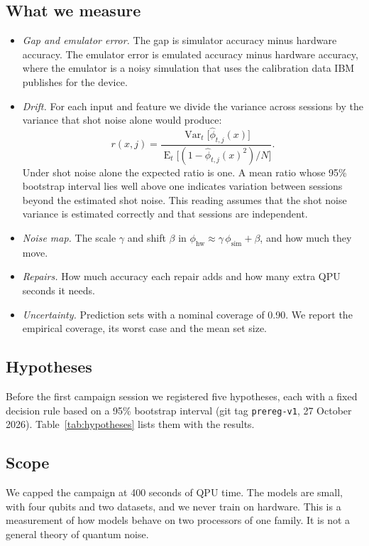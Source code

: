 \documentclass[10pt,conference]{IEEEtran}
\begin{document}
\subsection{What we measure}
\begin{itemize}
\item \emph{Gap and emulator error.} The gap is simulator accuracy minus hardware accuracy. The
emulator error is emulated accuracy minus hardware accuracy, where the emulator is a noisy
simulation that uses the calibration data IBM publishes for the device.
\item \emph{Drift.} For each input and feature we divide the variance across sessions by the
variance that shot noise alone would produce:
\begin{equation}
r(x,j)=\frac{\operatorname{Var}_t\big[\hat\phi_{t,j}(x)\big]}
{\operatorname{E}_t\big[(1-\hat\phi_{t,j}(x)^{2})/N\big]}.
\label{eq:drift}
\end{equation}
Under shot noise alone the expected ratio is one. A mean ratio whose 95\% bootstrap interval lies
well above one indicates variation between sessions beyond the estimated shot noise. This reading
assumes that the shot noise variance is estimated correctly and that sessions are independent.
\item \emph{Noise map.} The scale $\gamma$ and shift $\beta$ in
$\phi_{\mathrm{hw}}\approx\gamma\,\phi_{\mathrm{sim}}+\beta$, and how much they move.
\item \emph{Repairs.} How much accuracy each repair adds and how many extra QPU seconds it needs.
\item \emph{Uncertainty.} Prediction sets with a nominal coverage of 0.90. We report the empirical coverage, its worst case
and the mean set size.
\end{itemize}

\subsection{Hypotheses}
Before the first campaign session we registered five hypotheses, each with a fixed decision rule
based on a 95\% bootstrap interval (git tag \texttt{prereg-v1}, 27 October 2026).
Table~\ref{tab:hypotheses} lists them with the results.

\subsection{Scope}
We capped the campaign at 400 seconds of QPU time. The models are small, with four qubits and two
datasets, and we never train on hardware. This is a measurement of how models behave on two
processors of one family. It is not a general theory of quantum noise.
\end{document}
